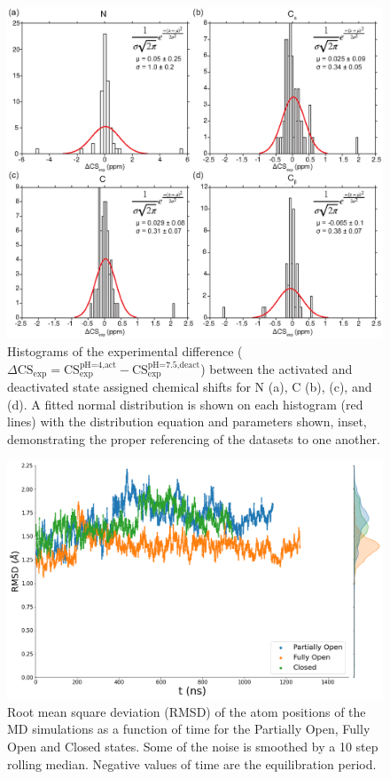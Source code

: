 \documentclass[%
 aip,
 amsmath,amssymb,
 preprint,%
]{revtex4-1}
\newcommand{\ca}{\ce{C_\alpha} }
\newcommand{\cb}{\ce{C_\beta} }
\begin{document}
\begin{figure}[tbp]
	\includegraphics[width=\textwidth]{figures_SI/exp_hist-05.eps}
	 \caption{\scriptsize
	 Histograms of the experimental difference ($\Delta\text{CS}_{\text{exp}} = \text{CS}_{\text{exp}}^{\text{pH=4,act}} - \text{CS}_{\text{exp}}^{\text{pH=7.5,deact}}$) between the activated and deactivated state assigned chemical shifts for N (a), C (b), \ca (c), and \cb (d). A fitted normal distribution is shown on each histogram (red lines) with the distribution equation and parameters shown, inset, demonstrating the proper referencing of the datasets to one another.
}
\label{SI_Exp_Hist}
\end{figure}


\begin{figure}[tbp]
	\includegraphics[width=\textwidth]{figures_SI/RMSD_print.png}
	 \caption{\scriptsize
	 Root mean square deviation (RMSD) of the \ca atom positions of the MD simulations as a function of time for the Partially Open, Fully Open and Closed states. Some of the noise is smoothed by a 10 step rolling median. Negative values of time are the equilibration period.
	 }
\label{SI_RMSD}
\end{figure} 
\end{document}
